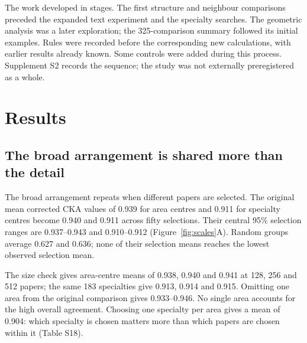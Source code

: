 \documentclass[12pt]{article}
\begin{document}
The work developed in stages. The first structure and neighbour comparisons preceded the expanded text experiment and the specialty searches. The geometric analysis was a later exploration; the 325-comparison summary followed its initial examples. Rules were recorded before the corresponding new calculations, with earlier results already known. Some controls were added during this process. Supplement S2 records the sequence; the study was not externally preregistered as a whole.

\section{Results}
\FloatBarrier
\subsection{The broad arrangement is shared more than the detail}
The broad arrangement repeats when different papers are selected. The original mean corrected CKA values of 0.939 for area centres and 0.911 for specialty centres become 0.940 and 0.911 across fifty selections. Their central 95\% selection ranges are 0.937--0.943 and 0.910--0.912 (Figure~\ref{fig:scales}A). Random groups average 0.627 and 0.636; none of their selection means reaches the lowest observed selection mean.

The size check gives area-centre means of 0.938, 0.940 and 0.941 at 128, 256 and 512 papers; the same 183 specialties give 0.913, 0.914 and 0.915. Omitting one area from the original comparison gives 0.933--0.946. No single area accounts for the high overall agreement. Choosing one specialty per area gives a mean of 0.904: which specialty is chosen matters more than which papers are chosen within it (Table S18).
\end{document}

